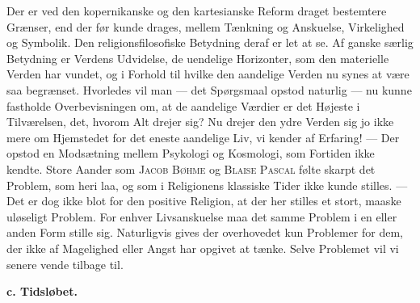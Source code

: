 \documentclass[12pt,a4paper,openany]{book}
\begin{document}
Der er ved den kopernikanske og den kartesianske Reform draget
bestemtere Grænser, end der før kunde drages, mellem Tænkning og
Anskuelse, Virkelighed og Symbolik. Den religionsfilosofiske Betydning
deraf er let at se. Af ganske særlig Betydning er Verdens Udvidelse, de
uendelige Horizonter, som den materielle Verden har vundet, og i Forhold
til hvilke den aandelige Verden nu synes at være saa begrænset.
Hvorledes vil man --- det Spørgsmaal opstod naturlig --- nu kunne
fastholde Overbevisningen om, at de aandelige Værdier er det Højeste i
Tilværelsen, det, hvorom Alt drejer sig? Nu drejer den ydre Verden sig
jo ikke mere om Hjemstedet for det eneste aandelige Liv, vi kender af
Erfaring! --- Der opstod en Modsætning mellem Psykologi og Kosmologi,
som Fortiden ikke kendte. Store Aander som \textsc{Jacob Bøhme} og
\textsc{Blaise Pascal} følte skarpt det Problem, som heri laa, og som i
Religionens klassiske Tider ikke kunde stilles. --- Det er dog ikke blot
for den positive Religion, at der her stilles et stort, maaske uløseligt
Problem. For enhver Livsanskuelse maa det samme Problem i en eller anden
Form stille sig. Naturligvis gives der overhovedet kun Problemer for
dem, der ikke af Magelighed eller Angst har opgivet at tænke. Selve
Problemet vil vi senere vende tilbage til.

\begin{center}\textbf{c. Tidsløbet.}\end{center}
\end{document}
